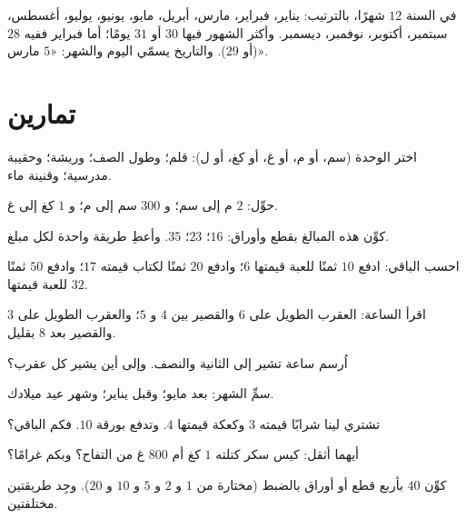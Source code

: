 \begin{example}[التقويم]\label{ex:g2:measure:calendar}
في السنة $12$ شهرًا، بالترتيب: يناير، فبراير، مارس، أبريل،
مايو، يونيو، يوليو، أغسطس، سبتمبر، أكتوبر، نوفمبر، ديسمبر.
وأكثر الشهور فيها $30$ أو $31$ يومًا؛ أما فبراير ففيه $28$ (أو $29$).
والتاريخ يسمّي اليوم والشهر: «$5$ مارس».
\end{example}

\section{تمارين}

\begin{exercise}[$\star$]\label{exo:g2:measure:1}
اختر الوحدة (سم، أو م، أو غ، أو كغ، أو ل): قلم؛ وطول
الصف؛ وريشة؛ وحقيبة مدرسية؛ وقنينة ماء.
\end{exercise}

\begin{exercise}[$\star$]\label{exo:g2:measure:2}
حوِّل: $2$ م إلى سم؛ و $300$ سم إلى م؛ و $1$ كغ إلى غ.
\end{exercise}

\begin{exercise}[$\star$]\label{exo:g2:measure:3}
كوِّن هذه المبالغ بقطع وأوراق: $16$؛ \quad $23$؛ \quad
$35$. وأعطِ طريقة واحدة لكل مبلغ.
\end{exercise}

\begin{exercise}[$\star$]\label{exo:g2:measure:4}
احسب الباقي: ادفع $10$ ثمنًا للعبة قيمتها $6$؛ وادفع $20$ ثمنًا
لكتاب قيمته $17$؛ وادفع $50$ ثمنًا للعبة قيمتها $32$.
\end{exercise}

\begin{exercise}[$\star$]\label{exo:g2:measure:5}
اقرأ الساعة: العقرب الطويل على $6$ والقصير بين $4$ و $5$؛
والعقرب الطويل على $3$ والقصير بعد $8$ بقليل.
\end{exercise}

\begin{exercise}[$\star$]\label{exo:g2:measure:6}
اُرسم ساعة تشير إلى الثانية والنصف. وإلى أين يشير كل عقرب؟
\end{exercise}

\begin{exercise}[$\star$]\label{exo:g2:measure:7}
سمِّ الشهر: بعد مايو؛ وقبل يناير؛ وشهر عيد
ميلادك.
\end{exercise}

\begin{exercise}[$\star$]\label{exo:g2:measure:8}
تشتري لينا شرابًا قيمته $3$ وكعكة قيمتها $4$. وتدفع بورقة $10$.
فكم الباقي؟
\end{exercise}

\begin{exercise}[$\star$]\label{exo:g2:measure:9}
أيهما أثقل: كيس سكر كتلته $1$ كغ أم $800$ غ من التفاح؟ وبكم
غرامًا؟
\end{exercise}

\begin{exercise}[$\star\star$]\label{exo:g2:measure:10}
كوِّن $40$ بأربع قطع أو أوراق بالضبط (مختارة من $1$ و $2$ و
$5$ و $10$ و $20$). وجِد طريقتين مختلفتين.
\end{exercise}
